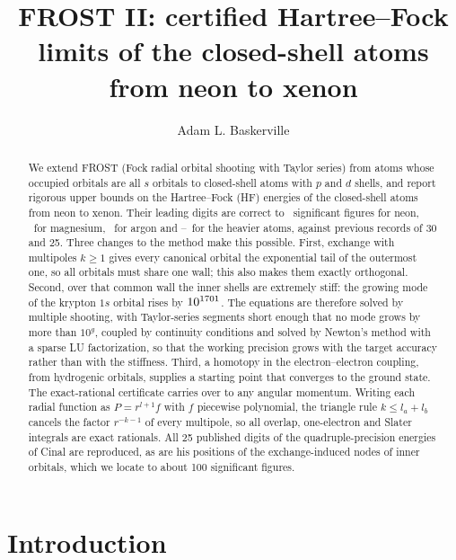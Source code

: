 \documentclass[aps,pra,reprint,superscriptaddress,amsmath,amssymb,longbibliography]{revtex4-2}
\begin{document}
\title{FROST II: certified Hartree--Fock limits of the closed-shell atoms from neon to xenon}

\author{Adam L. Baskerville}
\noaffiliation

\begin{abstract}
We extend FROST (Fock radial orbital shooting with Taylor series) from atoms whose occupied orbitals are all $s$ orbitals to closed-shell atoms with $p$ and $d$ shells, and report rigorous upper bounds on the Hartree--Fock (HF) energies of the closed-shell atoms from neon to xenon. Their leading digits are correct to \NeNsf\ significant figures for neon, \MgNsf\ for magnesium, \ArNsf\ for argon and \HeavyMin--\HeavyMax\ for the heavier atoms, against previous records of 30 and 25. Three changes to the method make this possible. First, exchange with multipoles $k\ge1$ gives every canonical orbital the exponential tail of the outermost one, so all orbitals must share one wall; this also makes them exactly orthogonal. Second, over that common wall the inner shells are extremely stiff: the growing mode of the krypton $1s$ orbital rises by $10^{1701}$. The equations are therefore solved by multiple shooting, with Taylor-series segments short enough that no mode grows by more than $10^g$, coupled by continuity conditions and solved by Newton's method with a sparse LU factorization, so that the working precision grows with the target accuracy rather than with the stiffness. Third, a homotopy in the electron--electron coupling, from hydrogenic orbitals, supplies a starting point that converges to the ground state. The exact-rational certificate carries over to any angular momentum. Writing each radial function as $P=r^{l+1}f$ with $f$ piecewise polynomial, the triangle rule $k\le l_a+l_b$ cancels the factor $r^{-k-1}$ of every multipole, so all overlap, one-electron and Slater integrals are exact rationals. All 25 published digits of the quadruple-precision energies of Cinal are reproduced, as are his positions of the exchange-induced nodes of inner orbitals, which we locate to about 100 significant figures.
\end{abstract}

\maketitle

\section{Introduction}
\end{document}
